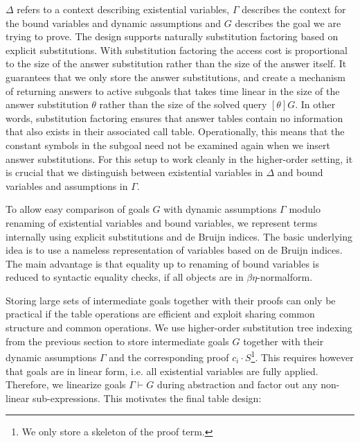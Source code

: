 \documentclass{llncs}
\newcommand{\vd}{\vdash}
\begin{document}
$\Delta$ refers to a context describing existential variables,
$\Gamma$ describes the context for the bound variables  and dynamic
assumptions and $G$ describes the goal we are trying to prove. 
The design supports naturally substitution factoring based on explicit
substitutions\cite{RamakrishnanJLP99}. With substitution factoring the
access cost is proportional to the size of the answer substitution
rather than the size of the answer itself. It guarantees that we only
store the answer substitutions, and create a mechanism of returning
answers to active subgoals that takes time linear in the size of the
answer substitution $\theta$ rather than the size of the solved query
$[\theta]G$. In other words, substitution factoring ensures that answer
tables contain no information that also exists in their associated
call table. Operationally, this means that the constant symbols in the
subgoal need not be examined again when we insert answer
substitutions. For this setup to work cleanly in the higher-order
setting, it is crucial that we distinguish between existential
variables in $\Delta$ and bound variables and assumptions 
in $\Gamma$. 

To allow easy comparison of goals $G$ with dynamic assumptions
$\Gamma$ modulo renaming of existential variables and bound variables, we
represent terms internally using explicit substitutions
\cite{Abadi:POPL90} and de Bruijn indices. The basic underlying idea
is to use a nameless representation of variables based on de Bruijn
indices. The main advantage is that equality up to renaming
of bound variables is reduced to syntactic equality checks, if all
objects are in $\beta\eta$-normalform.

Storing large sets of intermediate goals together with their proofs
can only be practical if the table operations are efficient and
exploit sharing common structure and common operations. We use
higher-order substitution tree indexing from the previous section to
store intermediate goals $G$ together with their dynamic assumptions
$\Gamma$ and the corresponding proof $c_i\cdot S$\footnote{We only
  store a skeleton of   the proof term.}. This requires however that
goals are in linear form, i.e. all existential variables are fully
applied. Therefore, we linearize goals $\Gamma \vd G$ during
abstraction and factor out any non-linear sub-expressions.
%
%
%
 This motivates the final table design: 
\end{document}

